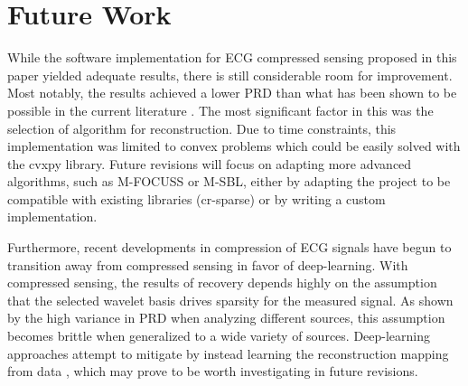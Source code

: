\section{Future Work}
While the software implementation for ECG compressed sensing proposed in this paper yielded adequate results, there is still considerable room for improvement.
Most notably, the results achieved a lower PRD than what has been shown to be possible in the current literature \citep{daponte2021}.
The most significant factor in this was the selection of algorithm for reconstruction.
Due to time constraints, this implementation was limited to convex problems which could be easily solved with the cvxpy library.
Future revisions will focus on adapting more advanced algorithms, such as M-FOCUSS or M-SBL, either by adapting the project to be compatible with existing libraries (cr-sparse) or by writing a custom implementation.
\newline
\par
Furthermore, recent developments in compression of ECG signals have begun to transition away from compressed sensing in favor of deep-learning.
With compressed sensing, the results of recovery depends highly on the assumption that the selected wavelet basis drives sparsity for the measured signal.
As shown by the high variance in PRD when analyzing different sources, this assumption becomes brittle when generalized to a wide variety of sources.
Deep-learning approaches attempt to mitigate by instead learning the reconstruction mapping from data \citep{erkoc2026}, which may prove to be worth investigating in future revisions.
